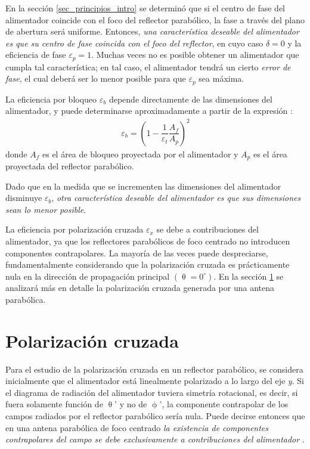 En la sección \ref{sec_principios_intro} se determinó que si el centro de fase del alimentador coincide con el foco del reflector parabólico, la fase a través del plano de abertura será uniforme. Entonces, \emph{una característica deseable del alimentador es que su centro de fase coincida con el foco del reflector}, en cuyo caso $\delta = 0$ y la eficiencia de fase $\varepsilon_p = 1$. Muchas veces no es posible obtener un alimentador que cumpla tal característica; en tal caso, el alimentador tendrá un cierto \emph{error de fase}, el cual deberá ser lo menor posible para que $\varepsilon_p$ sea máxima.

La eficiencia por bloqueo $\varepsilon_b$ depende directamente de las dimensiones del alimentador, y puede determinarse aproximadamente a partir de la expresión \cite{Stutzman}:
\begin{align}
\varepsilon_b  = \left(1 - \dfrac{1}{\varepsilon_t}\dfrac{A_f}{A_p}\right)^2
\label{ec_principios:88}
\end{align}
donde $A_f$ es el área de bloqueo proyectada por el alimentador y $A_p$ es el área proyectada del reflector parabólico.

Dado que en la medida que se incrementen las dimensiones del alimentador disminuye $\varepsilon_b$, \emph{otra característica deseable del alimentador es que sus dimensiones sean lo menor posible}.

La eficiencia por polarización cruzada $\varepsilon_x$ se debe a contribuciones del alimentador, ya que los reflectores parabólicos de foco centrado no introducen componentes contrapolares. La mayoría de las veces puede despreciarse, fundamentalmente considerando que la polarización cruzada es prácticamente nula en la dirección de propagación principal $\left(\uptheta = 0^{\circ}\right)$. En la sección \ref{sec_polarizacion_cruzada} se analizará más en detalle la polarización cruzada generada por una antena parabólica.

\section{Polarización cruzada}
\label{sec_polarizacion_cruzada}

Para el estudio de la polarización cruzada en un reflector parabólico, se considera inicialmente que el alimentador está linealmente polarizado a lo largo del eje \emph{y}. Si el diagrama de radiación del alimentador tuviera simetría rotacional, es decir, si fuera solamente función de $\uptheta$' y no de $\upphi$', la componente contrapolar de los campos radiados por el reflector parabólico sería nula. Puede decirse entonces que en una antena parabólica de foco centrado \emph{la existencia de componentes contrapolares del campo se debe exclusivamente a contribuciones del alimentador} \cite{Stutzman}.


